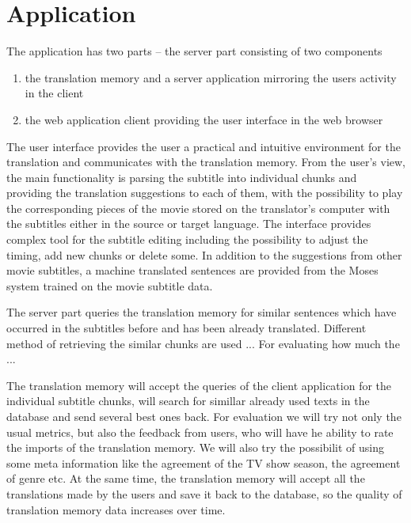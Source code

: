 
\section{Application}


The application has two parts -- the server part consisting of  two components
\begin{enumerate}
\item the translation memory and a server application mirroring the users activity in the client
\item the web application client providing the user interface in the web browser
\end{enumerate}

The user interface provides the user a practical and intuitive environment for the translation and  communicates with the translation memory.
From the user's view, the main functionality is parsing the subtitle into individual chunks 
and providing the translation suggestions to each of them,  with the possibility to play the corresponding pieces of the movie stored on the translator's computer with the subtitles either in the source or target language. 
The interface  provides complex tool for the subtitle editing including the possibility to adjust the timing, add new chunks or delete some. 
In addition to the suggestions from other movie subtitles, a machine translated sentences are provided from the Moses system trained on the movie subtitle data.


The server part queries the translation memory for similar sentences which have occurred in the subtitles before and has been already translated. Different method of retrieving the similar chunks are  used ... For evaluating how much the ...

The translation memory will accept the queries of the client application for the individual subtitle chunks, will search for simillar already used texts in the database and send several best ones back. For evaluation we will try not only the usual metrics, but also the feedback from users, who will have he ability to rate the imports of the translation memory. We will also try the possibilit of using some meta information like the agreement
of the TV show season, the agreement of genre etc. At the same time, the translation memory will accept all the translations made by the users and save it back to the database, so the quality of translation memory data increases over time.


